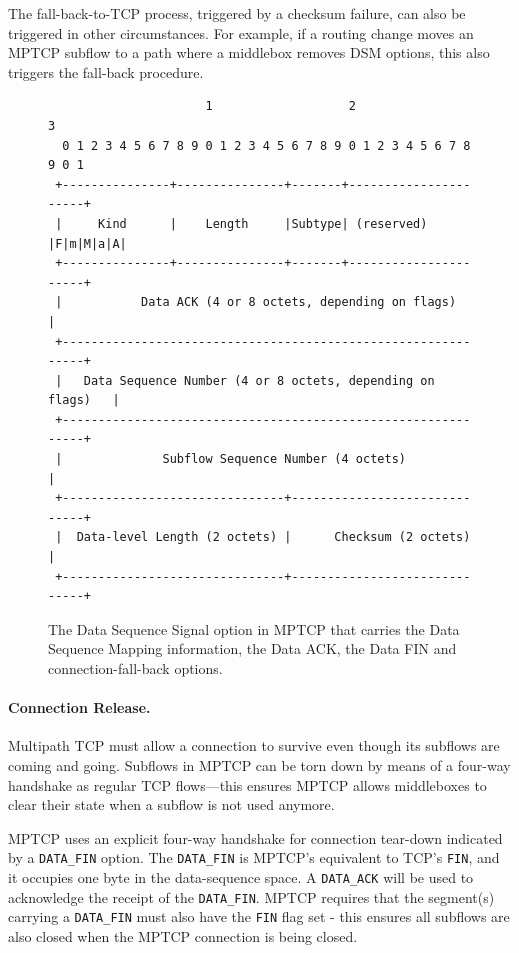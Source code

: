 The fall-back-to-TCP process, triggered by a checksum failure, can also
be triggered in other circumstances.  For example, if a routing
change moves an MPTCP subflow to a path where a middlebox
removes DSM options, this also triggers the fall-back procedure.


\begin{figure}[t]
\centering
\begin{verbatim}
                      1                   2                   3
  0 1 2 3 4 5 6 7 8 9 0 1 2 3 4 5 6 7 8 9 0 1 2 3 4 5 6 7 8 9 0 1
 +---------------+---------------+-------+----------------------+
 |     Kind      |    Length     |Subtype| (reserved) |F|m|M|a|A|
 +---------------+---------------+-------+----------------------+
 |           Data ACK (4 or 8 octets, depending on flags)       |
 +--------------------------------------------------------------+
 |   Data Sequence Number (4 or 8 octets, depending on flags)   |
 +--------------------------------------------------------------+
 |              Subflow Sequence Number (4 octets)              |
 +-------------------------------+------------------------------+
 |  Data-level Length (2 octets) |      Checksum (2 octets)     |
 +-------------------------------+------------------------------+
\end{verbatim}
\caption{The Data Sequence Signal option in MPTCP that carries the Data Sequence Mapping information,
the Data ACK, the Data FIN and connection-fall-back options. }
\label{fig:mptcp_dss}
\end{figure}

\paragraph{Connection Release.} Multipath TCP must allow a connection to survive
even though its subflows are coming and going. Subflows in MPTCP can be torn down
by means of a four-way handshake as regular TCP flows---this ensures MPTCP
allows middleboxes to clear their state when a subflow is not used anymore.

MPTCP uses an explicit four-way handshake for connection tear-down indicated by a \texttt{DATA\_FIN} option.
The \texttt{DATA\_FIN} is MPTCP's equivalent to TCP's \texttt{FIN}, and it occupies one byte in the data-sequence 
space. A \texttt{DATA\_ACK} will be used to acknowledge the receipt of the \texttt{DATA\_FIN}. MPTCP requires
that the segment(s) carrying a \texttt{DATA\_FIN} must also have the \texttt{FIN} flag set - this ensures
all subflows are also closed when the MPTCP connection is being closed.

